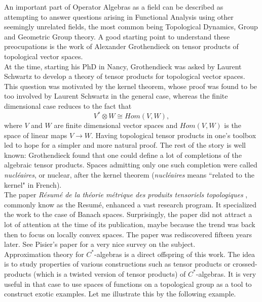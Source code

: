 An important part of Operator Algebras as a field can be described as attempting to answer questions arising in Functional Analysis using other seemingly unrelated fields, the most common being Topological Dynamics, Group and Geometric Group theory. A good starting point to understand these preocupations is the work of Alexander Grothendieck on tensor products of topological vector spaces. \\

At the time, starting his PhD in Nancy, Grothendieck was asked by Laurent Schwartz to develop a theory of tensor products for topological vector spaces. This question was motivated by the kernel theorem, whose proof was found to be too involved by Laurent Schwartz in the general case, whereas the finite dimensional case reduces to the fact that 
\[V^*\otimes W \cong Hom(V,W),\] 
where $V$ and $W$ are finite dimensional vector spaces and $Hom(V,W)$ is the space of linear maps $V\rightarrow W$. Having topological tensor products in one's toolbox led to hope for a simpler and more natural proof. The rest of the story is well known: Grothendieck found that one could define a lot of completions of the algebraic tensor products. Spaces admitting only one such completion were called \textit{nucl\'eaires}, or nuclear, after the kernel theorem (\textit{nucl\'eaires} means ``related to the kernel" in French).\\

The paper \textit{R\'esum\'e de la th\'eorie m\'etrique des produits tensoriels topologiques} \cite{GrothendieckResume}, commonly know as the Resum\'e, enhanced a vast research program. It specialized the work to the case of Banach spaces. Surprisingly, the paper did not attract a lot of attention at the time of its publication, maybe because the trend was back then to focus on locally convex spaces. The paper was rediscovered fifteen years later. See Pisier's paper \cite{PisierSurvey} for a very nice survey on the subject.\\

Approximation theory for $C^*$-algebras is a direct offspring of this work. The idea is to study properties of various constructions such as tensor products or crossed-products (which is a twisted version of tensor products) of $C^*$-algebras. It is very useful in that case to use spaces of functions on a topological group as a tool to construct exotic examples. Let me illustrate this by the following example.\\

